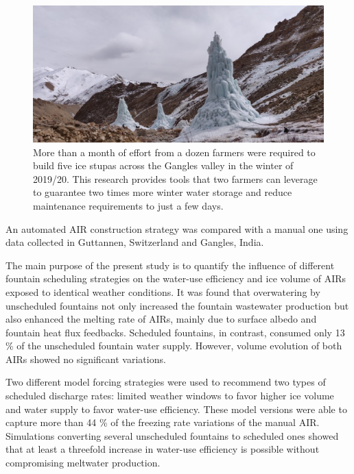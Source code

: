 \documentclass[tc, manuscript]{copernicus}
\begin{document}
\begin{figure}[htb]
	\includegraphics[width=\textwidth]{Figures/icestupa_valley}

  \caption{More than a month of effort from a dozen farmers were required to build five ice stupas across the
  Gangles valley in the winter of 2019/20. This research provides tools that two farmers can leverage to
  guarantee two times more winter water storage and reduce maintenance requirements to just a few days.}

	\label{fig:icestupa_valley}
\end{figure}

\conclusions

An automated AIR construction strategy was compared with a manual one using data collected in Guttannen,
Switzerland and Gangles, India.

The main purpose of the present study is to quantify the influence of different fountain scheduling strategies
on the water-use efficiency and ice volume of AIRs exposed to identical weather conditions. It was found that
overwatering by unscheduled fountains not only increased the fountain wastewater production but also enhanced
the melting rate of AIRs, mainly due to surface albedo and fountain heat flux feedbacks. Scheduled fountains, in
contrast, consumed only 13 \% of the unscheduled fountain water supply. However, volume evolution of both AIRs
showed no significant variations. 

Two different model forcing strategies were used to recommend two types of scheduled discharge rates: limited
weather windows to favor higher ice volume and water supply to favor water-use efficiency. These model versions
were able to capture more than 44 \% of the freezing rate variations of the manual AIR. Simulations
converting several unscheduled fountains to scheduled ones showed that at least a threefold increase in
water-use efficiency is possible without compromising meltwater production.
\end{document}
